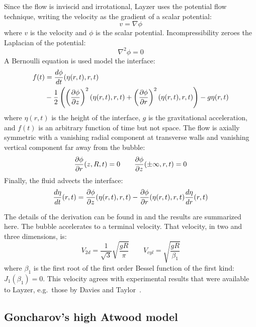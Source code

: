 Since the flow is inviscid and irrotational, Layzer uses the potential flow technique, writing the velocity as the gradient of a scalar potential:
\begin{equation}
v = \nabla \phi
\end{equation}
where 
$v$ is the velocity and 
$\phi$ is the scalar potential.
Incompressibility zeroes the Laplacian of the potential:
\begin{equation}
\nabla^2 \phi = 0
\end{equation}
A Bernoulli equation is used model the interface:
\begin{equation} \label{eqn:LayzerBernoulli}
\begin{aligned}
f(t) & = \frac{d \phi}{d t}(\eta(r,t), r, t) \\
& - \frac{1}{2} \left(\left(\frac{\partial \phi}{\partial z}\right)^2(\eta(r,t), r, t) +\left(\frac{\partial \phi}{\partial r}\right)^2(\eta(r,t), r, t)\right) - g \eta(r,t) 
\end{aligned}
\end{equation}
where 
$\eta(r,t)$ is the height of the interface,
$g$ is the gravitational acceleration, and 
$f(t)$ is an arbitrary function of time but not space.
The flow is axially symmetric with a vanishing radial component at transverse walls and vanishing vertical component far away from the bubble:
\begin{equation}
\frac{\partial \phi}{\partial r}(z,R,t) = 0 \qquad \frac{\partial \phi}{\partial z}(\pm \infty, r, t) = 0
\end{equation}
Finally, the fluid advects the interface:
\begin{equation}
\frac{d \eta}{d t}(r,t) = \frac{\partial \phi}{\partial z}(\eta(r,t), r, t) - \frac{\partial \phi}{\partial r}(\eta(r,t), r, t) \frac{d \eta}{d r}(r,t)
\end{equation}

The details of the derivation can be found in  and the results are summarized here.
The bubble accelerates to a terminal velocity.
That velocity, in two and three dimensions, is:
\begin{equation}
V_{2d} = \frac{1}{\sqrt{3}} \sqrt{\frac{g R}{\pi}}  \qquad V_{cyl} = \sqrt{\frac{g R}{\beta_1}} 
\end{equation}
where $\beta_1$ is the first root of the first order Bessel function of the first kind: $J_{1}(\beta_1) = 0$.
This velocity agrees with experimental results that were available to Layzer, e.g.\ those by Davies and Taylor~\cite{Davies1950a}.

\subsection{Goncharov's high Atwood model}

